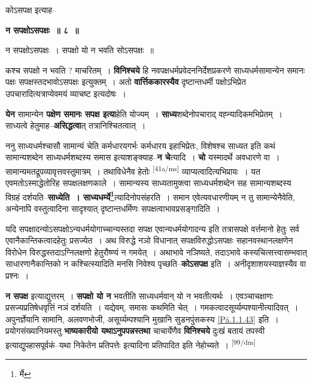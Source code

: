 \documentclass[article,12pt,a4paper]{memoir}
\begin{document}
	कोऽसपक्ष इत्याह-- 
	  
	\textbf{न सपक्षोऽसपक्षः ॥ ८ ॥} 
	  
	न सपक्षोऽसपक्षः । सपक्षो यो न भवति सोऽसपक्षः ॥ 
	  
	कश्च सपक्षो न भवति ? माचरितम् । \textbf{विनिश्चये} हि नवपक्षधर्मप्रवेदननिर्देशप्रकरणे साध्यधर्मसामान्येन समानः पक्षः सपक्षस्तदभावोऽसपक्षः इत्युक्तम् । अतो \textbf{वार्त्तिककारस्यैव} दृष्टान्तधर्मी पक्षोऽभिप्रेत उपचारादित्यत्राप्येवमयं व्याचष्ट इत्यदोषः ।
	\pend
      

	  \pstart \textbf{येन} सामान्येन \textbf{पक्षेण समानः सपक्ष इत्या}हेति योज्यम् । \textbf{साध्य}शब्देनोपचाराद् वह्न्यादिकमभिप्रेतम् । साध्यत्वे हेतुमाह--\textbf{असिद्धत्वा}त् तत्रानिश्चितत्वात् ।
	\pend
      

	  \pstart ननु साध्यधर्मश्चासौ सामान्यं चेति कर्मधारयगर्भः कर्मधारय इहाभिप्रेतः, विशेषश्च साध्यत इति कथं सामान्यशब्देन साध्यधर्मशब्दस्य समास इत्याशङ्क्याह--\textbf{न चे}त्यादि । \textbf{चो} यस्मादर्थे अवधारणे वा । सामान्यमतद्रूपव्यावृत्तवस्तुमात्रम् । तथाविधेनैव हेतोः \leavevmode\textsuperscript{\rmlatinfont\tiny [41a/ms]} व्याप्यत्वादित्यभिप्रायः । यत एवमतोऽस्माद्धेतोरिह सपक्षलक्षणकाले । सामान्यस्य साध्यतामुक्त्वा साध्यधर्मशब्देन सह सामान्यशब्दस्य विग्रहं दर्शयति--\textbf{साध्येति । साध्यधर्म्ये\footnote{र्मे}}त्यादिनोपसंहरति । समान एवेत्यवधारणीयम् न तु सामान्येनैवेति, अन्येनापि वस्तुत्वादिना सादृश्यात् दृष्टान्तधर्मिणः सपक्षत्वाभावप्रसङ्गादिति ।
	\pend
      

	  \pstart यदि सपक्षादन्योऽसपक्षोऽन्यधर्मयोगाच्चान्यस्तदा सपक्ष एवान्यधर्मयोगादन्य इति तत्रासपक्षे वर्त्तमानो हेतुः सर्व एवानैकान्तिकत्वादहेतुः प्रसज्येत । अथ विरुद्धे नञो विधानात् सपक्षविरुद्धोऽसपक्षः सहानवस्थानलक्षणेन विरोधेन विरुद्धस्तदाऽग्निलक्षणो हेतुरौष्ण्यं न गमयेत् । अथाभावे नञिष्यते, तदाऽभावे कस्यचित्सत्त्वासम्भवात् साधारणानैकान्तिको न कश्चित्स्यादिति मनसि निवेश्य पृच्छति--\textbf{कोऽसपक्ष} इति । अनीदृशाशयस्याज्ञस्यैव वा प्रश्नः ।
	\pend
      

	  \pstart \textbf{न सपक्ष} इत्याद्युत्तरम् । \textbf{सपक्षो यो न} भवतीति साध्यधर्मवान् यो न भवतीत्यर्थः । एवञ्चाचक्षाणः प्रसज्यप्रतिषेधवृत्तिं नञं दर्शयति । यद्येवम्, समासः कथमिति चेत् । गमकत्वादसूर्य्यम्पश्यानीत्यादिवत् । अपुनर्ज्ञेयानि सामानि, अलवणभोजी, असूर्य्यम्पश्यानि मुखानि सुडनपुंसकस्य \cref{Pā.1.1.43} इति । प्रयोगसंख्यानियमस्तु \textbf{भाष्यकारीयो यथाऽनुपपन्नस्तथा} चाचार्येणैव \textbf{विनिश्चये} दुःखं बतायं तपस्वी इत्याद्युपहासपूर्वकं--यथा निकेतेन प्रतिपत्तेः इत्यादिना प्रतिपादित इति नेहोच्यते ।
	\pend
      \leavevmode\textsuperscript{\rmlatinfont\tiny [99/dm]}
\end{document}
